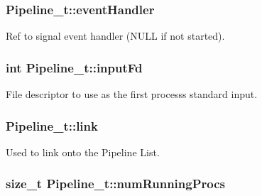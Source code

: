 \subsubsection[{\texorpdfstring{event\+Handler}{eventHandler}}]{ Pipeline\+\_\+t\+::event\+Handler}\hypertarget{struct_pipeline__t_a10aa8c3db34c8afc9a8df8bafa27d43b}{}\label{struct_pipeline__t_a10aa8c3db34c8afc9a8df8bafa27d43b}


Ref to signal event handler (N\+U\+LL if not started). 

\subsubsection[{\texorpdfstring{input\+Fd}{inputFd}}]{\setlength{\rightskip}{0pt plus 5cm}int Pipeline\+\_\+t\+::input\+Fd}\hypertarget{struct_pipeline__t_aaea86857b99c0cb856e77284bc125b05}{}\label{struct_pipeline__t_aaea86857b99c0cb856e77284bc125b05}


File descriptor to use as the first process\textquotesingle{}s standard input. 

\subsubsection[{\texorpdfstring{link}{link}}]{ Pipeline\+\_\+t\+::link}\hypertarget{struct_pipeline__t_a538886a22d5ef9fde1f79055a9fa4725}{}\label{struct_pipeline__t_a538886a22d5ef9fde1f79055a9fa4725}


Used to link onto the Pipeline List. 

\subsubsection[{\texorpdfstring{num\+Running\+Procs}{numRunningProcs}}]{\setlength{\rightskip}{0pt plus 5cm}size\+\_\+t Pipeline\+\_\+t\+::num\+Running\+Procs}\hypertarget{struct_pipeline__t_a7e5d6b798e627db6db429ae3bc73cb91}{}\label{struct_pipeline__t_a7e5d6b798e627db6db429ae3bc73cb91}


